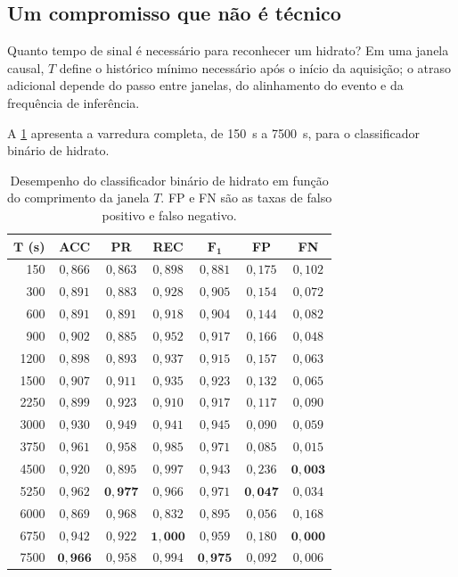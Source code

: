 \subsection{Um compromisso que não é técnico}

Quanto tempo de sinal é necessário para reconhecer um hidrato? Em uma janela causal,
$T$ define o histórico mínimo necessário após o início da aquisição; o atraso adicional
depende do passo entre janelas, do alinhamento do evento e da frequência de inferência.

A \cref{tab:closed-janelas} apresenta a varredura completa, de \SI{150}{\second} a
\SI{7500}{\second}, para o classificador binário de hidrato.

\begin{table}[htbp]
\centering
\caption{Desempenho do classificador binário de hidrato em função do comprimento da
janela $T$. FP e FN são as taxas de falso positivo e falso negativo.}
\label{tab:closed-janelas}
\small
\begin{tabular}{rcccccc}
\toprule
$\bm{T}$ \textbf{(s)} & \textbf{ACC} & \textbf{PR} & \textbf{REC} & $\bm{F_1}$ &
\textbf{FP} & \textbf{FN} \\
\midrule
150   & $0{,}866$ & $0{,}863$ & $0{,}898$ & $0{,}881$ & $0{,}175$ & $0{,}102$ \\
300   & $0{,}891$ & $0{,}883$ & $0{,}928$ & $0{,}905$ & $0{,}154$ & $0{,}072$ \\
600   & $0{,}891$ & $0{,}891$ & $0{,}918$ & $0{,}904$ & $0{,}144$ & $0{,}082$ \\
900   & $0{,}902$ & $0{,}885$ & $0{,}952$ & $0{,}917$ & $0{,}166$ & $0{,}048$ \\
1200  & $0{,}898$ & $0{,}893$ & $0{,}937$ & $0{,}915$ & $0{,}157$ & $0{,}063$ \\
1500  & $0{,}907$ & $0{,}911$ & $0{,}935$ & $0{,}923$ & $0{,}132$ & $0{,}065$ \\
2250  & $0{,}899$ & $0{,}923$ & $0{,}910$ & $0{,}917$ & $0{,}117$ & $0{,}090$ \\
3000  & $0{,}930$ & $0{,}949$ & $0{,}941$ & $0{,}945$ & $0{,}090$ & $0{,}059$ \\
3750  & $0{,}961$ & $0{,}958$ & $0{,}985$ & $0{,}971$ & $0{,}085$ & $0{,}015$ \\
4500  & $0{,}920$ & $0{,}895$ & $0{,}997$ & $0{,}943$ & $0{,}236$ & $\bm{0{,}003}$ \\
5250  & $0{,}962$ & $\bm{0{,}977}$ & $0{,}966$ & $0{,}971$ & $\bm{0{,}047}$ & $0{,}034$ \\
6000  & $0{,}869$ & $0{,}968$ & $0{,}832$ & $0{,}895$ & $0{,}056$ & $0{,}168$ \\
6750  & $0{,}942$ & $0{,}922$ & $\bm{1{,}000}$ & $0{,}959$ & $0{,}180$ & $\bm{0{,}000}$ \\
7500  & $\bm{0{,}966}$ & $0{,}958$ & $0{,}994$ & $\bm{0{,}975}$ & $0{,}092$ & $0{,}006$ \\
\bottomrule
\end{tabular}
\end{table}

